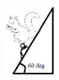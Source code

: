 \documentclass[11pt]{exam}
\begin{document}
\begin{questions}
\includegraphics[width=82px,height=117px]{f12_exam1_fig1}


\end{questions}
\end{document}

